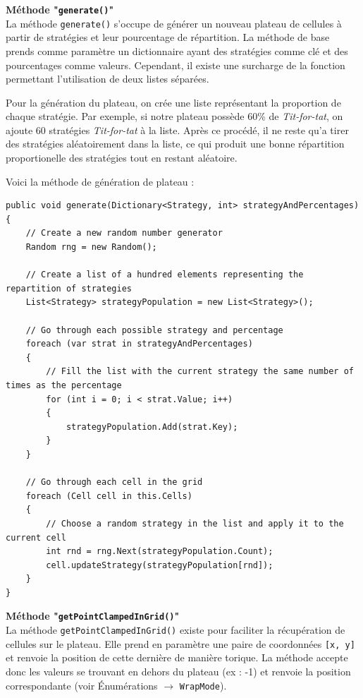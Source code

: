 \documentclass[a4paper, french]{article}
\begin{document}
\textbf{Méthode "\texttt{generate()}"}\\
La méthode \texttt{generate()} s'occupe de générer un nouveau plateau de cellules à partir de stratégies et leur pourcentage de répartition. La méthode de base prends comme paramètre un dictionnaire ayant des stratégies comme clé et des pourcentages comme valeurs. Cependant, il existe une surcharge de la fonction permettant l'utilisation de deux listes séparées.

Pour la génération du plateau, on crée une liste représentant la proportion de chaque stratégie. Par exemple, si notre plateau possède 60\% de \textit{Tit-for-tat}, on ajoute 60 stratégies \textit{Tit-for-tat} à la liste. Après ce procédé, il ne reste qu'a tirer des stratégies aléatoirement dans la liste, ce qui produit une bonne répartition proportionelle des stratégies tout en restant aléatoire.

Voici la méthode de génération de plateau :
\begin{lstlisting}
public void generate(Dictionary<Strategy, int> strategyAndPercentages)
{
    // Create a new random number generator
    Random rng = new Random();

    // Create a list of a hundred elements representing the repartition of strategies
    List<Strategy> strategyPopulation = new List<Strategy>();

    // Go through each possible strategy and percentage
    foreach (var strat in strategyAndPercentages)
    {
        // Fill the list with the current strategy the same number of times as the percentage
        for (int i = 0; i < strat.Value; i++)
        {
            strategyPopulation.Add(strat.Key);
        }
    }

    // Go through each cell in the grid
    foreach (Cell cell in this.Cells)
    {
        // Choose a random strategy in the list and apply it to the current cell
        int rnd = rng.Next(strategyPopulation.Count);
        cell.updateStrategy(strategyPopulation[rnd]);
    }
}
\end{lstlisting}


\textbf{Méthode "\texttt{getPointClampedInGrid()}"}\\
La méthode \texttt{getPointClampedInGrid()} existe pour faciliter la récupération de cellules sur le plateau. Elle prend en paramètre une paire de coordonnées \texttt{[x, y]} et renvoie la position de cette dernière de manière torique. La méthode accepte donc les valeurs se trouvant en dehors du plateau (ex : -1) et renvoie la position correspondante (voir Énumérations $\rightarrow$ \texttt{WrapMode}).
\end{document}
